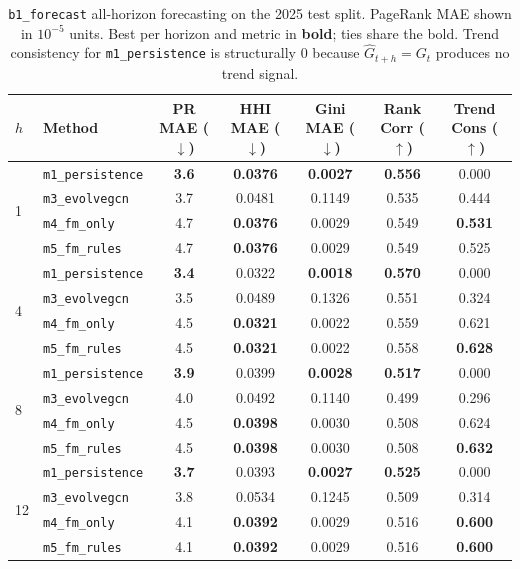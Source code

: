 \begin{table}[!htbp]
\centering
\footnotesize
\setlength{\tabcolsep}{4pt}
\caption{\texttt{b1\_forecast} all-horizon forecasting on the 2025 test split.
PageRank MAE shown in $10^{-5}$ units. Best per horizon and metric in
\textbf{bold}; ties share the bold. Trend consistency for
\texttt{m1\_persistence} is structurally $0$ because
$\hat G_{t+h}=G_t$ produces no trend signal.}
\label{tab:b1_all_horizons}
\begin{tabular}{l l c c c c c}
\toprule
$h$ & Method & PR MAE ($\downarrow$) & HHI MAE ($\downarrow$) & Gini MAE ($\downarrow$) & Rank Corr ($\uparrow$) & Trend Cons ($\uparrow$) \\
\midrule
\multirow{4}{*}{1}
& \texttt{m1\_persistence} & \textbf{3.6} & \textbf{0.0376} & \textbf{0.0027} & \textbf{0.556} & 0.000 \\
& \texttt{m3\_evolvegcn}   & 3.7          & 0.0481 & 0.1149          & 0.535          & 0.444 \\
& \texttt{m4\_fm\_only}    & 4.7          & \textbf{0.0376} & 0.0029          & 0.549          & \textbf{0.531} \\
& \texttt{m5\_fm\_rules}   & 4.7          & \textbf{0.0376} & 0.0029          & 0.549          & 0.525 \\
\midrule
\multirow{4}{*}{4}
& \texttt{m1\_persistence} & \textbf{3.4} & 0.0322 & \textbf{0.0018} & \textbf{0.570} & 0.000 \\
& \texttt{m3\_evolvegcn}   & 3.5          & 0.0489 & 0.1326          & 0.551          & 0.324 \\
& \texttt{m4\_fm\_only}    & 4.5          & \textbf{0.0321} & 0.0022 & 0.559          & 0.621 \\
& \texttt{m5\_fm\_rules}   & 4.5          & \textbf{0.0321} & 0.0022 & 0.558          & \textbf{0.628} \\
\midrule
\multirow{4}{*}{8}
& \texttt{m1\_persistence} & \textbf{3.9} & 0.0399 & \textbf{0.0028} & \textbf{0.517} & 0.000 \\
& \texttt{m3\_evolvegcn}   & 4.0          & 0.0492 & 0.1140          & 0.499          & 0.296 \\
& \texttt{m4\_fm\_only}    & 4.5          & \textbf{0.0398} & 0.0030 & 0.508          & 0.624 \\
& \texttt{m5\_fm\_rules}   & 4.5          & \textbf{0.0398} & 0.0030 & 0.508          & \textbf{0.632} \\
\midrule
\multirow{4}{*}{12}
& \texttt{m1\_persistence} & \textbf{3.7} & 0.0393 & \textbf{0.0027} & \textbf{0.525} & 0.000 \\
& \texttt{m3\_evolvegcn}   & 3.8          & 0.0534 & 0.1245          & 0.509          & 0.314 \\
& \texttt{m4\_fm\_only}    & 4.1          & \textbf{0.0392} & 0.0029 & 0.516          & \textbf{0.600} \\
& \texttt{m5\_fm\_rules}   & 4.1          & \textbf{0.0392} & 0.0029 & 0.516          & \textbf{0.600} \\
\bottomrule
\end{tabular}
\end{table}

